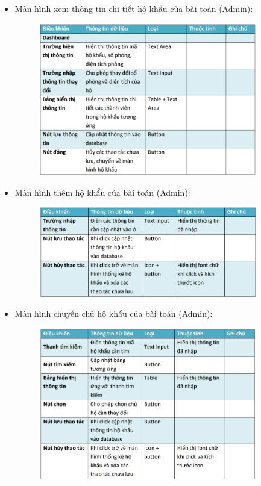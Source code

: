\documentclass{article}
\begin{document}
\begin{itemize}
\begin{figure}[H]
    \end{figure}
    \item Màn hình xem thông tin chi tiết hộ khẩu của bài toán (Admin):
    \begin{figure}[H]
        \centering
        \includegraphics[width=0.9\textwidth]{Ảnh chương 4/Chi tiết hộ khẩu Admin.png}
    \end{figure}
    \vspace{5cm}
    \item Màn hình thêm hộ khẩu của bài toán (Admin):
    \begin{figure}[H]
        \centering
        \includegraphics[width=0.9\textwidth]{Ảnh chương 4/Thêm hộ khẩu Admin.png}
    \end{figure}
    \item Màn hình chuyển chủ hộ khẩu của bài toán (Admin):
    \begin{figure}[H]
        \centering
        \includegraphics[width=0.9\textwidth]{Ảnh chương 4/Chuyển chủ hộ Admin.png}

\end{figure}
\end{itemize}
\end{document}
